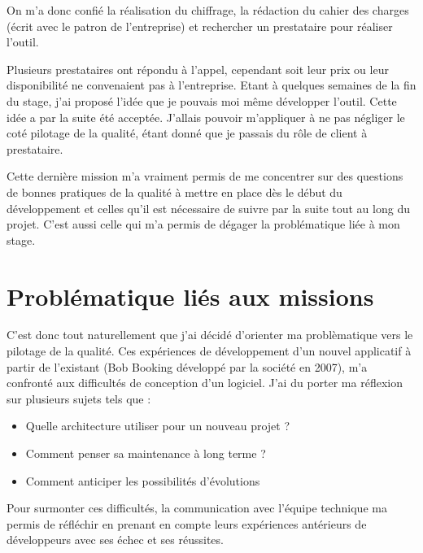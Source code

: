 On m'a donc confié la réalisation du chiffrage, la rédaction du cahier des charges (écrit avec le patron de l'entreprise) %
et rechercher un prestataire pour réaliser l'outil. 

Plusieurs prestataires ont répondu à l'appel, cependant soit leur prix ou leur disponibilité ne convenaient pas à l'entreprise. 
Etant à quelques semaines de la fin du stage, j'ai proposé l'idée que je pouvais moi même développer l'outil.
Cette idée a par la suite été acceptée.
J'allais pouvoir m'appliquer à ne pas négliger le coté pilotage de la qualité, étant donné que je passais du rôle de client à prestataire. 

Cette dernière mission m'a vraiment permis de me concentrer sur des questions de bonnes pratiques de la qualité à mettre en place dès le début du développement et celles qu'il est nécessaire de suivre par la suite tout au long du projet. 
C'est aussi celle qui m'a permis de dégager la problématique liée à mon stage. 

\section{Problématique liés aux missions}
C'est donc tout naturellement que j'ai décidé d'orienter ma problèmatique vers le pilotage de la qualité. 
\jumpOne
Ces expériences de développement d'un nouvel applicatif à partir de l'existant (Bob Booking développé par la société en 2007), m'a confronté aux difficultés de conception d'un logiciel.
J'ai du porter ma réflexion sur plusieurs sujets tels que : 
\begin{itemize}
\item Quelle architecture utiliser pour un nouveau projet ? 
\item Comment penser sa maintenance à long terme ? 
\item Comment anticiper les possibilités d'évolutions 
\end{itemize}
Pour surmonter ces difficultés, la communication avec l'équipe technique ma permis de réfléchir en prenant en compte leurs expériences antérieurs de développeurs avec ses échec et ses réussites. 



